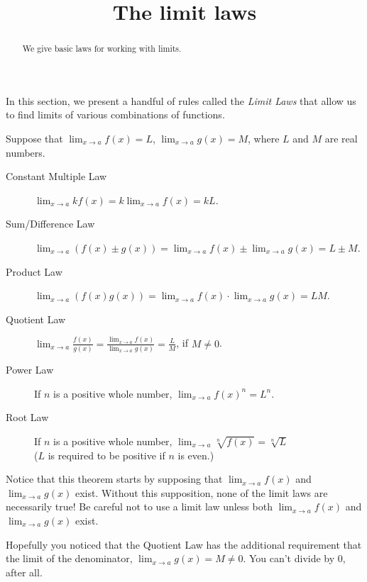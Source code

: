 \documentclass{ximera}
\title[Dig-In:]{The limit laws}
\begin{document}
\begin{abstract}
We give basic laws for working with limits. 
\end{abstract}
\maketitle

In this section, we present a handful of rules called the \textit{Limit Laws}
that allow us to find limits of various combinations of functions.

\begin{theorem}\label{theorem:limit-laws}
Suppose that $\displaystyle\lim_{x\to a}f(x)=L$, $\displaystyle\lim_{x\to a}g(x)=M$, where $L$ and $M$ are real numbers.
\begin{description}
\item[Constant Multiple Law] $\displaystyle\lim_{x\to a} kf(x) = k\displaystyle\lim_{x\to a}f(x)=kL$.\\
\item[Sum/Difference Law] $\displaystyle\lim_{x\to a} (f(x) \pm g(x)) =
  \lim_{x\to a}f(x) \pm \lim_{x\to a}g(x)=L \pm M$.
\item[Product Law]  $\displaystyle\lim_{x\to a} (f(x)g(x)) = \displaystyle\lim_{x\to
  a}f(x)\cdot\lim_{x\to a}g(x)=LM$.
\item[Quotient Law]  $\displaystyle\lim_{x\to a} \frac{f(x)}{g(x)} =
  \frac{\displaystyle\lim_{x\to a}f(x)}{\displaystyle\lim_{x\to a}g(x)}=\frac{L}{M}$, if
  $M\ne0$.
\item[Power Law] If $n$ is a positive whole number, $\displaystyle\lim_{x \to a} f(x)^n = L^n.$
\item[Root Law] If $n$ is a positive whole number, $\displaystyle\lim_{x \to a} \sqrt[n]{f(x)} = \sqrt[n]{L}$ \\ ($L$ is required to be positive if $n$ is even.)
\end{description}
\label{thm:limit laws}
\end{theorem}

\begin{warning}
Notice that this theorem starts by supposing that $\displaystyle\lim_{x\to a}f(x)$ and $\displaystyle\lim_{x\to a}g(x)$ exist.  Without this supposition, none of the limit laws are necessarily true!  Be careful not to use a limit law unless both $\displaystyle\lim_{x\to a}f(x)$ and $\displaystyle\lim_{x\to a}g(x)$ exist.
\end{warning}

\begin{warning}
Hopefully you noticed that the Quotient Law has the additional requirement that the limit of the denominator, $\displaystyle\lim_{x\to a}g(x)= M \neq 0$.  You can't divide by $0$, after all.  
\end{warning}
\end{document}
